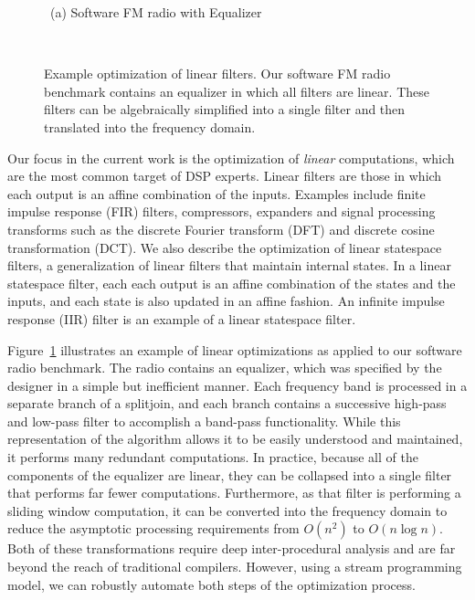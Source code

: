 \begin{figure}[t]

\mbox{~}{\small (a) Software FM radio with Equalizer}
\mbox{~}\hspace{0.35in}{\small (b) After linear combination}
\mbox{~}\hspace{0.15in}{\small (c) After translation to} \vspace{-0.2\baselineskip}

\mbox{~}\hspace{4.87in}{\small the frequency domain}
\caption[Example optimization of linear filters]{Example optimization
  of linear filters.  Our software FM radio benchmark contains an
  equalizer in which all filters are linear.  These filters can be
  algebraically simplified into a single filter and then translated
  into the frequency domain. \protect\label{fig:equalizer}}
\end{figure}

Our focus in the current work is the optimization of {\it linear}
computations, which are the most common target of DSP experts.  Linear
filters are those in which each output is an affine combination of the
inputs.  Examples include finite impulse response (FIR) filters,
compressors, expanders and signal processing transforms such as the
discrete Fourier transform (DFT) and discrete cosine transformation
(DCT).  We also describe the optimization of linear statespace
filters, a generalization of linear filters that maintain internal
states.  In a linear statespace filter, each each output is an affine
combination of the states and the inputs, and each state is also
updated in an affine fashion.  An infinite impulse response (IIR)
filter is an example of a linear statespace filter.

Figure~\ref{fig:equalizer} illustrates an example of linear
optimizations as applied to our software radio benchmark.  The radio
contains an equalizer, which was specified by the designer in a simple
but inefficient manner.  Each frequency band is processed in a
separate branch of a splitjoin, and each branch contains a successive
high-pass and low-pass filter to accomplish a band-pass functionality.
While this representation of the algorithm allows it to be easily
understood and maintained, it performs many redundant computations.  In
practice, because all of the components of the equalizer are linear,
they can be collapsed into a single filter that performs far fewer
computations.  Furthermore, as that filter is performing a sliding
window computation, it can be converted into the frequency domain to
reduce the asymptotic processing requirements from $O(n^2)$ to $O(n
\log n)$.  Both of these transformations require deep inter-procedural
analysis and are far beyond the reach of traditional compilers.
However, using a stream programming model, we can robustly automate
both steps of the optimization process.

